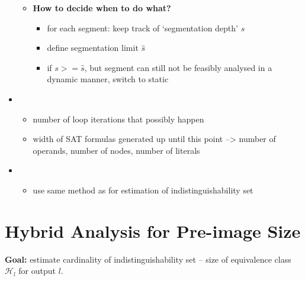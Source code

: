 \begin{itemize}
\begin{itemize}
        \item \textbf{How to decide when to do what?}
        \begin{itemize}
            \item for each segment: keep track of `segmentation depth' $s$
            \item define segmentation limit $\hat{s}$
            \item if $s >= \hat{s}$, but segment can still not be feasibly analysed in a dynamic manner, switch to static 
        \end{itemize}
    \end{itemize}
    
    
    \item {}
    \begin{itemize}
        \item number of loop iterations that possibly happen
        \item width of SAT formulas generated up until this point --> number of operands, number of nodes, number of literals
        
    \end{itemize}
     \item {}
    \begin{itemize}
        \item use same method as for estimation of indistinguishability set
    \end{itemize}
    
\end{itemize}


\section{Hybrid Analysis for Pre-image Size}
\textbf{Goal: }estimate cardinality of indistinguishability set -- size of equivalence class $\mathcal{H}_l$ for output $l$.

